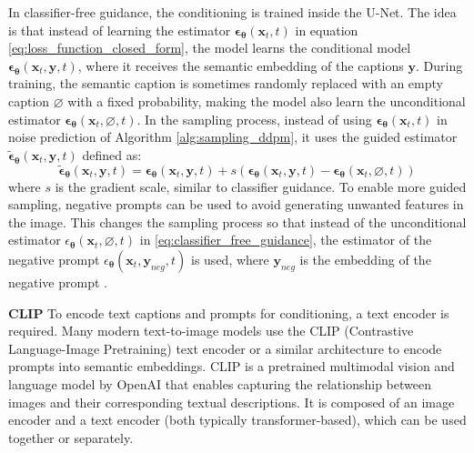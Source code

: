 In classifier-free guidance, the conditioning is trained inside the U-Net. The idea is that instead of learning the estimator $\boldsymbol{\epsilon}_{\boldsymbol{\theta}}\left(\mathbf{x}_{t}, t\right)$ in equation \ref{eq:loss_function_closed_form}, the model learns the conditional model $\boldsymbol{\epsilon}_{\boldsymbol{\theta}}\left(\mathbf{x}_{t}, \mathbf{y}, t\right)$, where it receives the semantic embedding of the captions $\mathbf{y}$. During training, the semantic caption is sometimes randomly replaced with an empty caption $\varnothing$ with a fixed probability, making the model also learn the unconditional estimator $\boldsymbol{\epsilon}_{\boldsymbol{\theta}}\left(\mathbf{x}_{t}, \varnothing, t\right)$. In the sampling process, instead of using $\boldsymbol{\epsilon}_{\boldsymbol{\theta}}\left(\mathbf{x}_{t}, t\right)$ in noise prediction of Algorithm \ref{alg:sampling_ddpm}, it uses the guided estimator $\tilde{\boldsymbol{\epsilon}}_{\boldsymbol{\theta}}\left(\mathbf{x}_{t}, \mathbf{y}, t\right)$ defined as:
\begin{equation}
    \tilde{\boldsymbol{\epsilon}}_{\boldsymbol{\theta}}\left(\mathbf{x}_{t}, \mathbf{y}, t\right)=\boldsymbol{\epsilon}_{\boldsymbol{\theta}}\left(\mathbf{x}_{t}, \mathbf{y}, t\right)+s\left(\boldsymbol{\epsilon}_{\boldsymbol{\theta}}\left(\mathbf{x}_{t}, \mathbf{y}, t\right)-\boldsymbol{\epsilon}_{\boldsymbol{\theta}}\left(\mathbf{x}_{t}, \varnothing, t\right)\right)
    \label{eq:classifier_free_guidance}
\end{equation}
where $s$ is the gradient scale, similar to classifier guidance. \cite{strümke2023lecturenotesprobabilisticdiffusion, ho2022classifierfreediffusionguidance} To enable more guided sampling, negative prompts can be used to avoid generating unwanted features in the image. This changes the sampling process so that instead of the unconditional estimator $\epsilon_{\boldsymbol{\theta}}\left(\mathbf{x}_{t}, \varnothing, t\right)$ in \ref{eq:classifier_free_guidance}, the estimator of the negative prompt $\epsilon_{\boldsymbol{\theta}}\left(\mathbf{x}_{t}, \mathbf{y}_{neg}, t\right)$ is used, where $\mathbf{y}_{neg}$ is the embedding of the negative prompt \cite{ban2024understandingimpactnegativeprompts}.

{\textbf{CLIP}}
To encode text captions and prompts for conditioning, a text encoder is required. Many modern text-to-image models use the CLIP (Contrastive Language-Image Pretraining) text encoder or a similar architecture to encode prompts into semantic embeddings. CLIP is a pretrained multimodal vision and language model by OpenAI that enables capturing the relationship between images and their corresponding textual descriptions. It is composed of an image encoder and a text encoder (both typically transformer-based), which can be used together or separately. \cite{CLIP}

